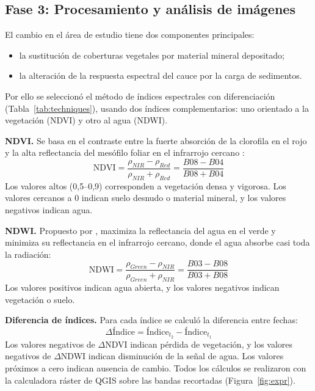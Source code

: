 \documentclass[12pt]{article}
\begin{document}
\subsection{Fase 3: Procesamiento y análisis de imágenes}
El cambio en el área de estudio tiene dos componentes principales:
\begin{itemize}
    \item la sustitución de coberturas vegetales por material mineral depositado;
    \item la alteración de la respuesta espectral del cauce por la carga de sedimentos.
\end{itemize}
Por ello se seleccionó el método de índices espectrales con diferenciación (Tabla~\ref{tab:techniques}), usando dos índices complementarios: uno orientado a la vegetación (NDVI) y otro al agua (NDWI).

\textbf{NDVI.} Se basa en el contraste entre la fuerte absorción de la clorofila en el rojo y la alta reflectancia del mesófilo foliar en el infrarrojo cercano \parencite{Rouse1974, Tucker1979}:
\begin{equation}
\mathrm{NDVI} = \frac{\rho_{NIR} - \rho_{Red}}{\rho_{NIR} + \rho_{Red}} = \frac{B08 - B04}{B08 + B04}
\end{equation}
Los valores altos (0{,}5--0{,}9) corresponden a vegetación densa y vigorosa. Los valores cercanos a 0 indican suelo desnudo o material mineral, y los valores negativos indican agua.

\textbf{NDWI.} Propuesto por \textcite{McFeeters1996}, maximiza la reflectancia del agua en el verde y minimiza su reflectancia en el infrarrojo cercano, donde el agua absorbe casi toda la radiación:
\begin{equation}
\mathrm{NDWI} = \frac{\rho_{Green} - \rho_{NIR}}{\rho_{Green} + \rho_{NIR}} = \frac{B03 - B08}{B03 + B08}
\end{equation}
Los valores positivos indican agua abierta, y los valores negativos indican vegetación o suelo.

\textbf{Diferencia de índices.} Para cada índice se calculó la diferencia entre fechas:
\begin{equation}
\Delta \text{Índice} = \text{Índice}_{t_2} - \text{Índice}_{t_1}
\end{equation}
Los valores negativos de $\Delta$NDVI indican pérdida de vegetación, y los valores negativos de $\Delta$NDWI indican disminución de la señal de agua. Los valores próximos a cero indican ausencia de cambio. Todos los cálculos se realizaron con la calculadora ráster de QGIS sobre las bandas recortadas (Figura~\ref{fig:expr}).
\end{document}
